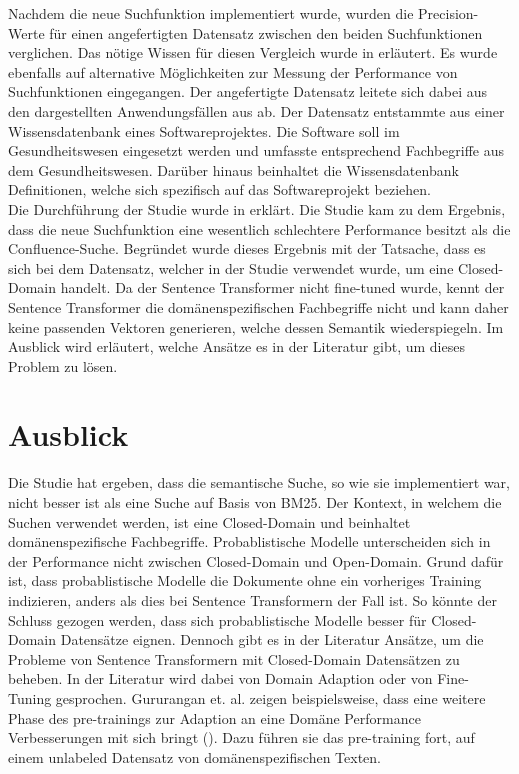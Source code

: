 Nachdem die neue Suchfunktion implementiert wurde, wurden die Precision-Werte für einen angefertigten Datensatz zwischen den beiden Suchfunktionen verglichen.
Das nötige Wissen für diesen Vergleich wurde in  erläutert.
Es wurde ebenfalls auf alternative Möglichkeiten zur Messung der Performance von Suchfunktionen eingegangen.
Der angefertigte Datensatz leitete sich dabei aus den dargestellten Anwendungsfällen aus  ab.
Der Datensatz entstammte aus einer Wissensdatenbank eines Softwareprojektes.
Die Software soll im Gesundheitswesen eingesetzt werden und umfasste entsprechend Fachbegriffe aus dem Gesundheitswesen.
Darüber hinaus beinhaltet die Wissensdatenbank Definitionen, welche sich spezifisch auf das Softwareprojekt beziehen.\\

Die Durchführung der Studie wurde in  erklärt.
Die Studie kam zu dem Ergebnis, dass die neue Suchfunktion eine wesentlich schlechtere Performance besitzt als die Confluence-Suche.
Begründet wurde dieses Ergebnis mit der Tatsache, dass es sich bei dem Datensatz, welcher in der Studie verwendet wurde, um eine Closed-Domain handelt.
Da der Sentence Transformer nicht fine-tuned wurde, kennt der Sentence Transformer die domänenspezifischen Fachbegriffe nicht und kann daher keine passenden Vektoren generieren, welche dessen Semantik wiederspiegeln.
Im Ausblick wird erläutert, welche Ansätze es in der Literatur gibt, um dieses Problem zu lösen.

\section{Ausblick}
\label{chap:ausblick}
Die Studie hat ergeben, dass die semantische Suche, so wie sie implementiert war, nicht besser ist als eine Suche auf Basis von BM25.
Der Kontext, in welchem die Suchen verwendet werden, ist eine Closed-Domain und beinhaltet domänenspezifische Fachbegriffe.
Probablistische Modelle unterscheiden sich in der Performance nicht zwischen Closed-Domain und Open-Domain.
Grund dafür ist, dass probablistische Modelle die Dokumente ohne ein vorheriges Training indizieren, anders als dies bei Sentence Transformern der Fall ist. 
So könnte der Schluss gezogen werden, dass sich probablistische Modelle besser für Closed-Domain Datensätze eignen.
Dennoch gibt es in der Literatur Ansätze, um die Probleme von Sentence Transformern mit Closed-Domain Datensätzen zu beheben.
In der Literatur wird dabei von Domain Adaption oder von Fine-Tuning gesprochen.
Gururangan et. al. zeigen beispielsweise, dass eine weitere Phase des pre-trainings zur Adaption an eine Domäne Performance Verbesserungen mit sich bringt (\cite{Gururangan_Marasović_Swayamdipta_Lo_Beltagy_Downey_Smith_2020}).
Dazu führen sie das pre-training fort, auf einem unlabeled Datensatz von domänenspezifischen Texten.\\

